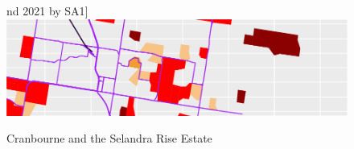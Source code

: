 \documentclass[preprint, 3p,
authoryear]{elsarticle} %
\begin{document}
\begin{figure}
nd 2021 by SA1\label{fig:Selandra_rise-5}]{\includegraphics{ReynoldsCurrieQu2024_files/figure-latex/Selandra_rise-5} }\newline\hfill{}

\caption{Cranbourne and the Selandra Rise Estate}\label{fig:Selandra_rise}
\end{figure}
\end{document}
